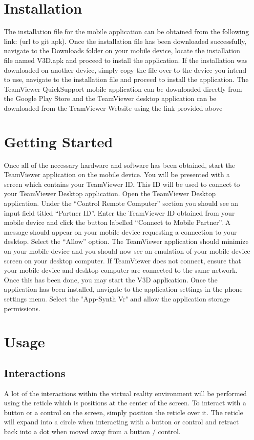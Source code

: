 \documentclass[english]{article}
\begin{document}
\section{Installation}
The installation file for the mobile application can be obtained from the following link: (url to git apk). Once the installation file has been downloaded successfully, navigate to the Downloads folder on your mobile device, locate the installation file named V3D.apk and proceed to install the application. If the installation was downloaded on another device, simply copy the file over to the device you intend to use, navigate to the installation file and proceed to install the application. The TeamViewer QuickSupport mobile application can be downloaded directly from the Google Play Store and the TeamViewer desktop application can be downloaded from the TeamViewer Website using the link provided above 
 
\section{Getting Started}
Once all of the necessary hardware and software has been obtained, start the TeamViewer application on the mobile device. You will be presented with a screen which contains your TeamViewer ID. This ID will be used to connect to your TeamViewer Desktop application. Open the TeamViewer Desktop application. Under the “Control Remote Computer” section you should see an input field titled “Partner ID”. Enter the TeamViewer ID obtained from your mobile device and click the button labelled “Connect to Mobile Partner”. A message should appear on your mobile device requesting a connection to your desktop. Select the “Allow” option. The TeamViewer application should minimize on your mobile device and you should now see an emulation of your mobile device screen on your desktop computer. If TeamViewer does not connect, ensure that your mobile device and desktop computer are connected to the same network. Once this has been done, you may start the V3D application. Once the application has been installed, navigate to the application settings in the phone settings menu. Select the "App-Synth Vr" and allow the application storage permissions.

\section{Usage} 
\subsection{Interactions}
A lot of the interactions within the virtual reality environment will be performed using the reticle which is positions at the center of the screen. To interact with a button or a control on the screen, simply position the reticle over it. The reticle will expand into a circle when interacting with a button or control and retract back into a dot when moved away from a button / control.
\end{document}
